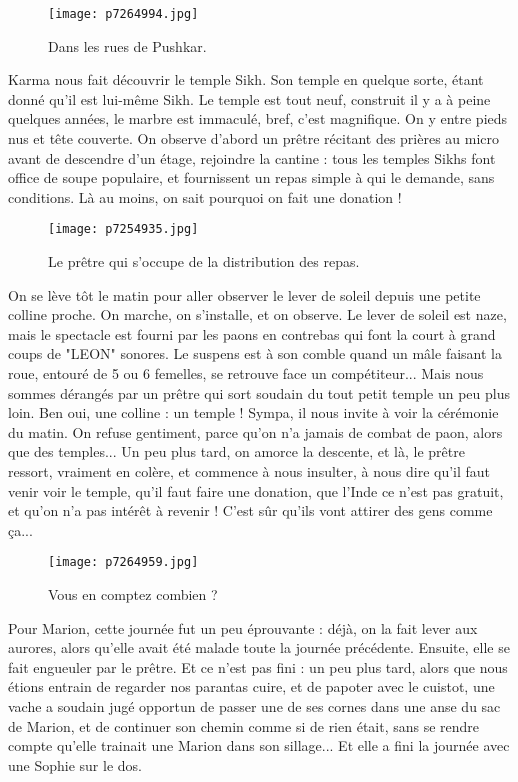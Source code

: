 \documentclass{book}
\begin{document}
\begin{figure}[h]
\centering
\texttt{[image: p7264994.jpg]}
\caption*{Dans les rues de Pushkar.}
\end{figure}

Karma nous fait découvrir le temple Sikh. Son temple en quelque sorte, étant donné qu'il est lui-même Sikh. Le temple est tout neuf, construit il y a à peine quelques années, le marbre est immaculé, bref, c'est magnifique. On y entre pieds nus et tête couverte. On observe d'abord un prêtre récitant des prières au micro avant de descendre d'un étage, rejoindre la cantine : tous les temples Sikhs font office de soupe populaire, et fournissent un repas simple à qui le demande, sans conditions. Là au moins, on sait pourquoi on fait une donation !


\begin{figure}[h]
\centering
\texttt{[image: p7254935.jpg]}
\caption*{Le prêtre qui s'occupe de la distribution des repas.}
\end{figure}

On se lève tôt le matin pour aller observer le lever de soleil depuis une petite colline proche. On marche, on s'installe, et on observe. Le lever de soleil est naze, mais le spectacle est fourni par les paons en contrebas qui font la court à grand coups de "LEON" sonores. Le suspens est à son comble quand un mâle faisant la roue, entouré de 5 ou 6 femelles, se retrouve face un compétiteur... Mais nous sommes dérangés par un prêtre qui sort soudain du tout petit temple un peu plus loin. Ben oui, une colline : un temple ! Sympa, il nous invite à voir la cérémonie du matin. On refuse gentiment, parce qu'on n'a jamais de combat de paon, alors que des temples... Un peu plus tard, on amorce la descente, et là, le prêtre ressort, vraiment en colère, et commence à nous insulter, à nous dire qu'il faut venir voir le temple, qu'il faut faire une donation, que l'Inde ce n'est pas gratuit, et qu'on n'a pas intérêt à revenir ! C'est sûr qu'ils vont attirer des gens comme ça...


\begin{figure}[h]
\centering
\texttt{[image: p7264959.jpg]}
\caption*{Vous en comptez combien ?}
\end{figure}

Pour Marion, cette journée fut un peu éprouvante : déjà, on la fait lever aux aurores, alors qu'elle avait été malade toute la journée précédente. Ensuite, elle se fait engueuler par le prêtre. Et ce n'est pas fini : un peu plus tard, alors que nous étions entrain de regarder nos parantas cuire, et de papoter avec le cuistot, une vache a soudain jugé opportun de passer une de ses cornes dans une anse du sac de Marion, et de continuer son chemin comme si de rien était, sans se rendre compte qu'elle trainait une Marion dans son sillage... Et elle a fini la journée avec une Sophie sur le dos.
\end{document}
